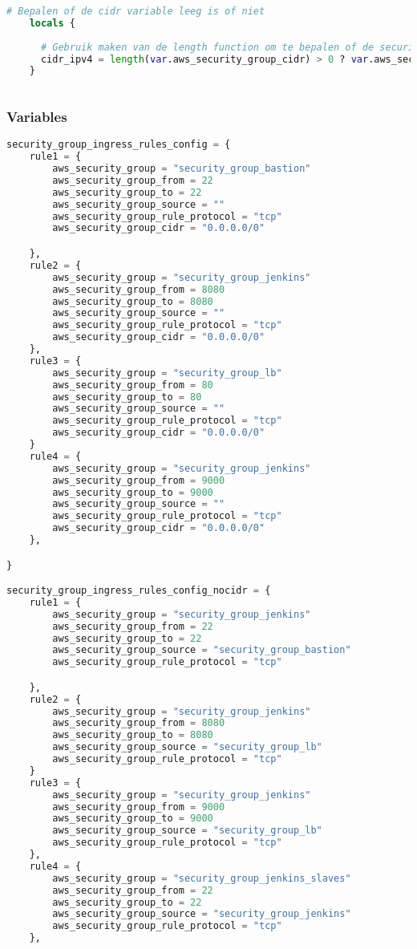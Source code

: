 \begin{lstlisting}[language=terraform]
    # Bepalen of de cidr variable leeg is of niet
    locals {
    
      # Gebruik maken van de length function om te bepalen of de security group cidr is leeg, indien leeg return a null object
      cidr_ipv4 = length(var.aws_security_group_cidr) > 0 ? var.aws_security_group_cidr : null
    }
    
\end{lstlisting}

\subsubsection{
{Variables}}
\label{sec:Variables}

\begin{lstlisting}[language=terraform]
  security_group_ingress_rules_config = {
    rule1 = {
        aws_security_group = "security_group_bastion"
        aws_security_group_from = 22
        aws_security_group_to = 22
        aws_security_group_source = ""
        aws_security_group_rule_protocol = "tcp"
        aws_security_group_cidr = "0.0.0.0/0"

    },
    rule2 = {
        aws_security_group = "security_group_jenkins"
        aws_security_group_from = 8080
        aws_security_group_to = 8080
        aws_security_group_source = ""
        aws_security_group_rule_protocol = "tcp"
        aws_security_group_cidr = "0.0.0.0/0"
    },
    rule3 = {
        aws_security_group = "security_group_lb"
        aws_security_group_from = 80
        aws_security_group_to = 80
        aws_security_group_source = ""
        aws_security_group_rule_protocol = "tcp"
        aws_security_group_cidr = "0.0.0.0/0"
    }
    rule4 = {
        aws_security_group = "security_group_jenkins"
        aws_security_group_from = 9000
        aws_security_group_to = 9000
        aws_security_group_source = ""
        aws_security_group_rule_protocol = "tcp"
        aws_security_group_cidr = "0.0.0.0/0"
    },

}

security_group_ingress_rules_config_nocidr = {
    rule1 = {
        aws_security_group = "security_group_jenkins"
        aws_security_group_from = 22
        aws_security_group_to = 22
        aws_security_group_source = "security_group_bastion"
        aws_security_group_rule_protocol = "tcp"

    },
    rule2 = {
        aws_security_group = "security_group_jenkins"
        aws_security_group_from = 8080
        aws_security_group_to = 8080
        aws_security_group_source = "security_group_lb"
        aws_security_group_rule_protocol = "tcp"
    }
    rule3 = {
        aws_security_group = "security_group_jenkins"
        aws_security_group_from = 9000
        aws_security_group_to = 9000
        aws_security_group_source = "security_group_lb"
        aws_security_group_rule_protocol = "tcp"
    },
    rule4 = {
        aws_security_group = "security_group_jenkins_slaves"
        aws_security_group_from = 22
        aws_security_group_to = 22
        aws_security_group_source = "security_group_jenkins"
        aws_security_group_rule_protocol = "tcp"
    },


\end{lstlisting}
